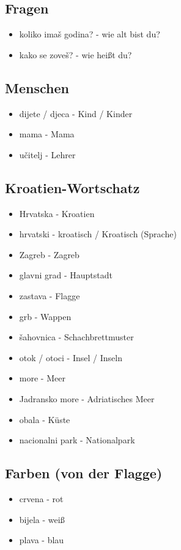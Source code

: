 \subsection*{Fragen}
\begin{itemize}
    \item koliko imaš godina? - wie alt bist du?
    \item kako se zoveš? - wie heißt du?
\end{itemize}

\subsection*{Menschen}
\begin{itemize}
    \item dijete / djeca - Kind / Kinder
    \item mama - Mama
    \item učitelj - Lehrer
\end{itemize}

\subsection*{Kroatien-Wortschatz}
\begin{itemize}
    \item Hrvatska - Kroatien
    \item hrvatski - kroatisch / Kroatisch (Sprache)
    \item Zagreb - Zagreb
    \item glavni grad - Hauptstadt
    \item zastava - Flagge
    \item grb - Wappen
    \item šahovnica - Schachbrettmuster
    \item otok / otoci - Insel / Inseln
    \item more - Meer
    \item Jadransko more - Adriatisches Meer
    \item obala - Küste
    \item nacionalni park - Nationalpark
\end{itemize}

\subsection*{Farben (von der Flagge)}
\begin{itemize}
    \item crvena - rot
    \item bijela - weiß
    \item plava - blau
\end{itemize}

